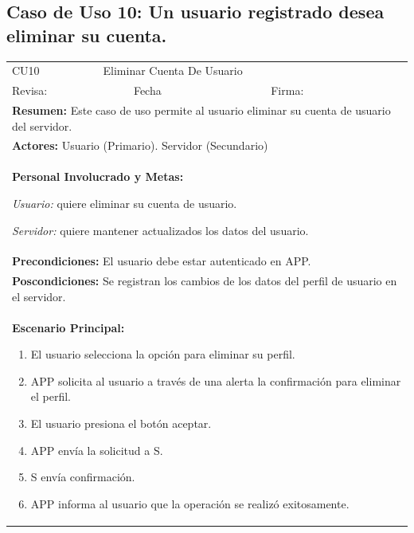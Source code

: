 		\subsection{Caso de Uso 10: Un usuario registrado desea eliminar su cuenta.}
			\begin{longtable}{|l|p{5.5cm}|l|p{2cm}|l|p{1.9cm}|} \hline
					\cellcolor{grisOscuro} CU10 & \multicolumn{4}{|l|}{  \cellcolor{grisOscuro} Eliminar Cuenta De Usuario} &  \cellcolor{grisClaro}\multirow{2}{1cm}{} \\ \cline{1-5}
					\cellcolor{grisOscuro} Revisa: &  \cellcolor{grisClaro} &  \cellcolor{grisOscuro} Fecha &  \cellcolor{grisClaro} &  \cellcolor{grisOscuro} Firma: & \cellcolor{grisClaro} \\ \hline
					\multicolumn{6}{|p{15cm}|}{ \textbf{Resumen: } Este caso de uso permite al usuario eliminar su cuenta de usuario del servidor.

					} \\ \hline

					\multicolumn{6}{|p{15cm}|}{ \textbf{Actores: } Usuario (Primario). Servidor (Secundario)

					} \\ \hline

					\multicolumn{6}{|p{15cm}|}{ \textbf{Personal Involucrado y Metas: }
					
					\emph{Usuario:} quiere eliminar su cuenta de usuario.

					\emph{Servidor:} quiere mantener actualizados los datos del usuario.

					} \\ \hline

					\multicolumn{6}{|p{15cm}|}{ \textbf{Precondiciones: } El usuario debe estar autenticado en APP.

					} \\ \hline

					\multicolumn{6}{|p{15cm}|}{ \textbf{Poscondiciones: } Se registran los cambios de los datos del perfil de usuario en el servidor.

					} \\ \hline

					\multicolumn{6}{|p{15cm}|}{ \textbf{Escenario Principal: }

					\begin{enumerate}
							\item El usuario selecciona la opción para eliminar su perfil.
							\item APP solicita al usuario a través de una alerta la confirmación para eliminar el perfil.
							\item El usuario presiona el botón aceptar.
							\item APP envía la solicitud a S.
							\item S envía confirmación.
							\item APP informa al usuario que la operación se realizó exitosamente.
					\end{enumerate}

}
\end{longtable}
